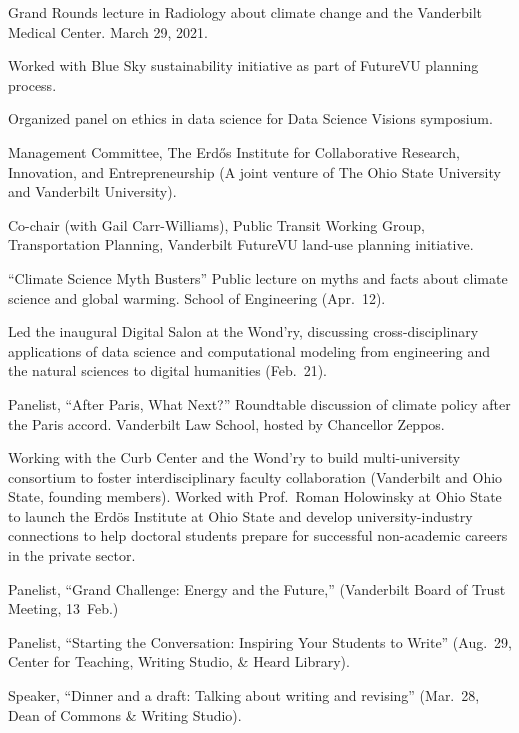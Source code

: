 \item[2021] Grand Rounds lecture in Radiology about climate change and the
Vanderbilt Medical Center. March 29, 2021.
\item[2018--2019] Worked with Blue Sky sustainability initiative as part of FutureVU planning process.
\item[2018] Organized panel on ethics in data science for Data Science Visions symposium.
\item[2017--present] Management Committee, The Erd\H{o}s Institute for Collaborative Research, Innovation, and Entrepreneurship (A joint venture of The Ohio State University and Vanderbilt University).
\item[2017] Co-chair (with Gail Carr-Williams), Public Transit Working Group, Transportation Planning, Vanderbilt FutureVU land-use planning initiative.
\item[2017] ``Climate Science Myth Busters'' Public lecture on myths and facts about climate science and global warming. School of Engineering (Apr.~12).
\item[2017] Led the inaugural Digital Salon at the Wond'ry, discussing cross-disciplinary applications of data science and computational modeling from engineering and the natural sciences to digital humanities (Feb.~21).
\item[2016] Panelist, ``After Paris, What Next?''  Roundtable discussion of climate policy after the Paris accord. Vanderbilt Law School, hosted by Chancellor Zeppos.
\item[2015--2017] Working with the Curb Center and the Wond'ry to build multi-university consortium to foster interdisciplinary faculty collaboration (Vanderbilt and Ohio State, founding members).  Worked with Prof.\ Roman Holowinsky at Ohio State to launch the Erd\"os Institute at Ohio State and develop university-industry connections to help doctoral students prepare for successful non-academic careers in the private sector.
\item[2015] Panelist, ``Grand Challenge: Energy and the Future,'' (Vanderbilt Board of Trust Meeting, 13~Feb.)
\item[2013] Panelist, ``Starting the Conversation: Inspiring Your Students to Write'' (Aug.~29, Center for Teaching, Writing Studio, \& Heard Library).
\item[2013] Speaker, ``Dinner and a draft: Talking about writing and revising'' (Mar.~28, Dean of Commons \& Writing Studio).
